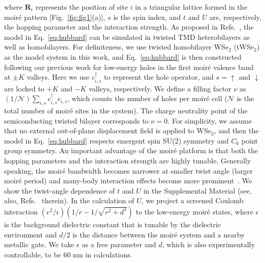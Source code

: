 \documentclass[aps,prl,floatfix,twocolumn]{revtex4-1}
\begin{document}
where $\bm{R}_i$ represents the position of site $i$ in a triangular lattice formed in the moir\'e pattern [Fig.~\ref{fig:fig1}(a)], $s$ is the spin index, and $t$ and $U$ are, respectively, the hopping parameter and the interaction strength. As proposed in Refs.~\cite{wu2018hubbard, wu2019topological, pan2020band}, the model in Eq.~\eqref{eq:hubbard} can be simulated in twisted TMD heterobilayers as well as homobilayers. For definiteness, we use twisted homobilayer WSe$_2$ (tWSe$_2$) as the model system in this work, and Eq.~\eqref{eq:hubbard} is then constructed following our previous work \cite{pan2020band} for low-energy holes in the first moir\'e valence band at $\pm K$ valleys. Here we use  $c_{i,s}^\dagger$ to represent the hole operator, and $s=\uparrow$ and $\downarrow$ are locked to $+K$ and $-K$ valleys, respectively. We define a filling factor $\nu$ as $(1/\mathcal{N}) \sum_{i,s} c_{i,s}^{\dagger} c_{i,s} $, which counts the number of holes per moir\'e cell ($\mathcal{N}$ is the total number of moir\'e sites in the system). The charge neutrality point of the semiconducting twisted bilayer corresponds to $\nu=0$. For simplicity, we assume that  no external out-of-plane displacement field is applied to WSe$_2$, and then the model in  Eq.~\eqref{eq:hubbard} respects emergent spin SU(2) symmetry and $C_6$ point group symmetry. An important advantage of the moir\'e platform is that both the hopping parameters and the interaction strength are highly tunable. Generally speaking, the moir\'e bandwidth becomes narrower at smaller twist angle (larger moir\'e period) and many-body interaction effects become more prominent~\cite{wu2018hubbard, wu2019topological, naik2018ultraflatbands}. We show the twist-angle dependence of $t$ and $U$ in the Supplemental Material \cite{SM} (see, also, Refs.~\cite{fukui2005chern,yu2011equivalent} therein). In the calculation of $U$, we project a screened Coulomb interaction $(e^2/\epsilon)(1/r-1/\sqrt{r^2+d^2})$ to the low-energy moir\'e states, where $\epsilon$ is the background dielectric constant that is tunable by the dielectric environment and $d/2$ is the distance between the moir\'e system and a nearby metallic gate. We take $\epsilon$ as a free parameter and  $d$, which is also experimentally controllable, to be 60 nm in calculations.  
\end{document}
